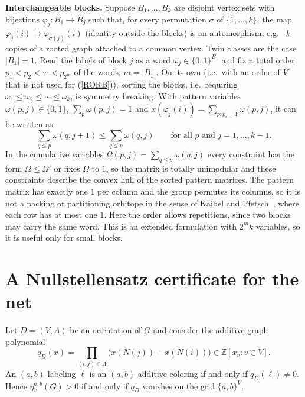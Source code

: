 \documentclass[a4paper,11pt]{article}
\newcommand{\ie}{{i.e.~}}
\newcommand{\eg}{{e.g.~}}
\newcommand{\Z}{\mathbb{Z}}
\newcommand{\etav}{\eta_v^{a,b}}
\theoremstyle{definition}
\begin{document}
\noindent\textbf{Interchangeable blocks.} Suppose $B_1, \ldots, B_k$ are disjoint vertex sets with bijections $\varphi_j : B_1 \to B_j$ such that, for every
permutation $\sigma$ of $\{1, \ldots, k\}$, the map $\varphi_j(i) \mapsto \varphi_{\sigma(j)}(i)$ (identity outside the blocks) is an automorphism, \eg
$k$ copies of a rooted graph attached to a common vertex. Twin classes are the case $|B_1| = 1$. Read the labels of block $j$ as a word
$\omega_j \in \{0,1\}^{B_1}$ and fix a total order $p_1 < p_2 < \cdots < p_{2^m}$ of the words, $m = |B_1|$. On its own (\ie with an order of $V$ that is not used for (\ref{RORB})), sorting the blocks, \ie requiring
$\omega_1 \leq \omega_2 \leq \cdots \leq \omega_k$, is symmetry breaking. With pattern variables $\omega(p,j) \in \{0,1\}$, $\sum_p \omega(p,j) = 1$
and $x(\varphi_j(i)) = \sum_{p : p_i = 1} \omega(p,j)$, it can be written as
$$\sum_{q \leq p} \omega(q, j+1) \leq \sum_{q \leq p} \omega(q, j) \qquad \textrm{for all } p \textrm{ and } j = 1, \ldots, k-1.$$
In the cumulative variables $\Omega(p,j) = \sum_{q \leq p} \omega(q,j)$ every constraint has the form $\Omega \leq \Omega'$ or fixes $\Omega$ to $1$, so the
matrix is totally unimodular and these constraints describe the convex hull of the sorted pattern matrices. The pattern matrix has exactly one $1$ per
column and the group permutes its columns, so it is not a packing or partitioning orbitope in the sense of Kaibel and Pfetsch~\cite{KP08}, where each
row has at most one $1$. Here the order allows repetitions, since two blocks may carry the same word. This is an extended formulation with
$2^m k$ variables, so it is useful only for small blocks.

\section{A Nullstellensatz certificate for the net} \label{SNULL}

Let $D = (V,A)$ be an orientation of $G$ and consider the additive graph polynomial
$$q_D(x) = \prod_{(i,j) \in A} \bigl( x(N(j)) - x(N(i)) \bigr) \in \Z[x_v : v \in V].$$
An $(a,b)$-labeling $\ell$ is an $(a,b)$-additive coloring if and only if $q_D(\ell) \neq 0$. Hence
$\etav(G) > 0$ if and only if $q_D$ vanishes on the grid $\{a,b\}^V$.
\end{document}
